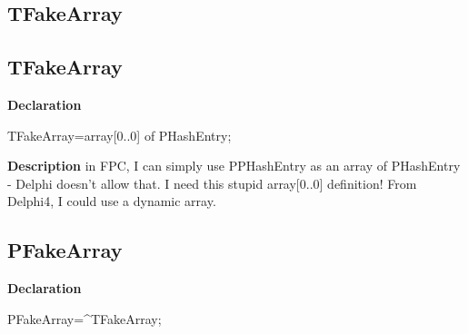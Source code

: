 \documentclass{report}
\newif\ifpdf
\begin{document}
\subsection*{\large{\textbf{TFakeArray}}\normalsize\hspace{1ex}\hrulefill}
\else
\subsection*{TFakeArray}
\fi
\label{PasDoc_Hashes-TFakeArray}
\begin{list}{}{
\setlength{\itemindent}{0cm}
\setlength{\listparindent}{0cm}
\setlength{\leftmargin}{\evensidemargin}
\addtolength{\leftmargin}{\tmplength}
\settowidth{\labelsep}{X}
\addtolength{\leftmargin}{\labelsep}
\setlength{\labelwidth}{\tmplength}
}
\item[\textbf{Declaration}\hfill]
\ifpdf
\begin{flushleft}
\fi
\begin{ttfamily}
TFakeArray=array[0..0] of PHashEntry;\end{ttfamily}

\ifpdf
\end{flushleft}
\fi

\par
\item[\textbf{Description}]
in FPC, I can simply use PPHashEntry as an array of PHashEntry {-} Delphi doesn't allow that. I need this stupid array[0..0] definition! From Delphi4, I could use a dynamic array.

\end{list}
\ifpdf
\subsection*{\large{\textbf{PFakeArray}}\normalsize\hspace{1ex}\hrulefill}
\else
\subsection*{PFakeArray}
\fi
\label{PasDoc_Hashes-PFakeArray}
\begin{list}{}{
\setlength{\itemindent}{0cm}
\setlength{\listparindent}{0cm}
\setlength{\leftmargin}{\evensidemargin}
\addtolength{\leftmargin}{\tmplength}
\settowidth{\labelsep}{X}
\addtolength{\leftmargin}{\labelsep}
\setlength{\labelwidth}{\tmplength}
}
\item[\textbf{Declaration}\hfill]
\ifpdf
\begin{flushleft}
\fi
\begin{ttfamily}
PFakeArray={\^{}}TFakeArray;\end{ttfamily}

\ifpdf
\end{flushleft}
\fi

\end{list}
\end{document}
